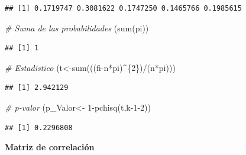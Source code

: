 \documentclass{staprojteamusb}
\newenvironment{Shaded}{\begin{snugshade}}{\end{snugshade}}
\newcommand{\CommentTok}[1]{\textcolor[rgb]{0.56,0.35,0.01}{\textit{#1}}}
\newcommand{\DecValTok}[1]{\textcolor[rgb]{0.00,0.00,0.81}{#1}}
\newcommand{\FunctionTok}[1]{\textcolor[rgb]{0.00,0.00,0.00}{#1}}
\newcommand{\NormalTok}[1]{#1}
\newcommand{\OtherTok}[1]{\textcolor[rgb]{0.56,0.35,0.01}{#1}}
\newcommand{\SpecialCharTok}[1]{\textcolor[rgb]{0.00,0.00,0.00}{#1}}
\begin{document}
\begin{verbatim}
## [1] 0.1719747 0.3081622 0.1747250 0.1465766 0.1985615
\end{verbatim}

\begin{Shaded}
\begin{Highlighting}[]
\CommentTok{\# Suma de las probabilidades}
\NormalTok{(}\FunctionTok{sum}\NormalTok{(pi))}
\end{Highlighting}
\end{Shaded}

\begin{verbatim}
## [1] 1
\end{verbatim}

\begin{Shaded}
\begin{Highlighting}[]
\CommentTok{\# Estadistico}
\NormalTok{(t}\OtherTok{\textless{}{-}}\FunctionTok{sum}\NormalTok{(((fi}\SpecialCharTok{{-}}\NormalTok{n}\SpecialCharTok{*}\NormalTok{pi)}\SpecialCharTok{\^{}}\NormalTok{\{}\DecValTok{2}\NormalTok{\})}\SpecialCharTok{/}\NormalTok{(n}\SpecialCharTok{*}\NormalTok{pi)))}
\end{Highlighting}
\end{Shaded}

\begin{verbatim}
## [1] 2.942129
\end{verbatim}

\begin{Shaded}
\begin{Highlighting}[]
\CommentTok{\# p{-}valor}
\NormalTok{(p\_Valor}\OtherTok{\textless{}{-}} \DecValTok{1}\SpecialCharTok{{-}}\FunctionTok{pchisq}\NormalTok{(t,k}\DecValTok{{-}1{-}2}\NormalTok{))}
\end{Highlighting}
\end{Shaded}

\begin{verbatim}
## [1] 0.2296808
\end{verbatim}

 \textbf{Matriz de correlación}
\end{document}
